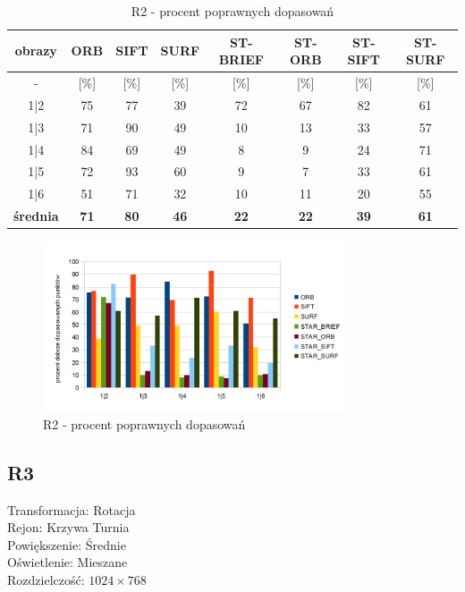 \begin{table}[htbp]
  \centering
  \caption{R2 - procent poprawnych dopasowań}
    \begin{tabular}{|c|c|c|c|c|c|c|c|}\hline
    obrazy & \textbf{ORB} & \textbf{SIFT} & \textbf{SURF} & \textbf{ST-BRIEF} & \textbf{ST-ORB} & \textbf{ST-SIFT} & \textbf{ST-SURF} \\\hline
     - & [\%] & [\%] & [\%] & [\%] & [\%] & [\%] & [\%] \\\hline
    1|2 & 75 & 77 & 39 & 72 & 67 & 82 & 61 \\
    1|3 & 71 & 90 & 49 & 10 & 13 & 33 & 57 \\
    1|4 & 84 & 69 & 49 & 8 & 9 & 24 & 71 \\
    1|5 & 72 & 93 & 60 & 9 & 7 & 33 & 61 \\
    1|6 & 51 & 71 & 32 & 10 & 11 & 20 & 55 \\\hline
    \textbf{średnia} & \textbf{71} & \textbf{80} & \textbf{46} & \textbf{22} & \textbf{22} & \textbf{39} & \textbf{61} \\\hline
    
    \end{tabular}%
  \label{tab:r2_m2}%
\end{table}%


\begin{figure}
\centering
\includegraphics[width=0.8\textwidth]{pict/slowik/r2/m2.png}
\caption{R2 - procent poprawnych dopasowań}
\label{fig:r2_m2}
\end{figure}




\FloatBarrier
\newpage
\subsection{R3}
Transformacja: Rotacja\\
Rejon: Krzywa Turnia\\
Powiększenie: Średnie\\
Oświetlenie: Mieszane\\
Rozdzielczość: $1024 \times 768$\\

